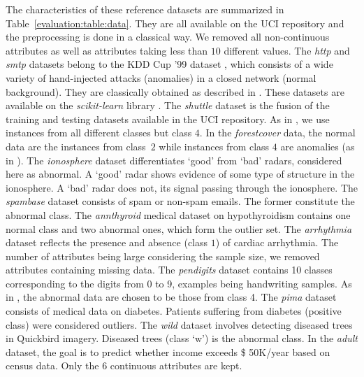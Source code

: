 


The characteristics of these reference datasets are summarized in Table~\ref{evaluation:table:data}. They are all available on the UCI repository \citep{Lichman2013} and the preprocessing is done in a classical way. %
We removed all non-continuous attributes as well as attributes taking less than $10$ different values.
%
The \emph{http} and \emph{smtp} datasets belong to the KDD Cup '99 dataset \citep{KDD99,Tavallaee2009}, which consists of a wide variety of hand-injected  attacks (anomalies) in a closed network (normal background). They are classically obtained as described in \cite{Yamanishi2000}. These datasets are available on the \emph{scikit-learn} library \citep{sklearn2011}.
The \emph{shuttle} dataset is the fusion of the training and testing datasets available in the UCI repository. As in \cite{Liu2008}, we use instances from all different classes but class $4$. %
In the \emph{forestcover} data, the normal data are the instances from class~$2$ while instances from class $4$ are anomalies (as in \cite{Liu2008}). %
The \emph{ionosphere} dataset differentiates `good' from `bad' radars, considered here as abnormal. A `good' radar shows evidence of some type of structure in the ionosphere. A `bad' radar does not, its signal passing through the ionosphere.
The \emph{spambase} dataset consists of spam or non-spam emails. The former constitute the abnormal class.
The \emph{annthyroid} medical dataset on hypothyroidism contains one normal class and two abnormal ones, which form the outlier set.
The \emph{arrhythmia} dataset reflects the presence and absence (class $1$) of cardiac arrhythmia. The number of attributes being large considering the sample size, we removed attributes containing missing data.
The \emph{pendigits} dataset contains 10 classes corresponding to the digits from 0 to 9, examples being handwriting samples. As in \cite{Schubert2012}, the abnormal data are chosen to be those from class 4.
The \emph{pima} dataset consists of medical data on diabetes. Patients suffering from diabetes (positive class) were considered outliers.
The \emph{wild} dataset involves detecting diseased trees in Quickbird imagery. Diseased trees (class `w') is the abnormal class.
In the \emph{adult} dataset, the goal is to predict whether income exceeds \$ 50K/year based on census data. Only the 6 continuous attributes are kept.

